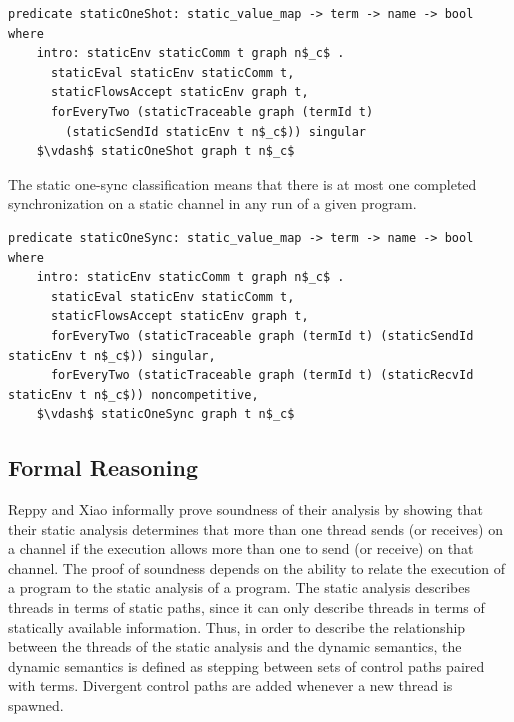 \documentclass[letterpaper, 11pt]{extarticle}
\begin{document}
\begin{lstlisting}[language=logic, mathescape]
  predicate staticOneShot: static_value_map -> term -> name -> bool where
    intro: staticEnv staticComm t graph n$_c$ .
      staticEval staticEnv staticComm t,
      staticFlowsAccept staticEnv graph t,
      forEveryTwo (staticTraceable graph (termId t)
        (staticSendId staticEnv t n$_c$)) singular
    $\vdash$ staticOneShot graph t n$_c$
\end{lstlisting}

The static one-sync classification means that there is at most one
completed synchronization on a static channel in any run of a given program.

\begin{lstlisting}[language=logic, mathescape]
  predicate staticOneSync: static_value_map -> term -> name -> bool where
    intro: staticEnv staticComm t graph n$_c$ .
      staticEval staticEnv staticComm t,
      staticFlowsAccept staticEnv graph t,
      forEveryTwo (staticTraceable graph (termId t) (staticSendId staticEnv t n$_c$)) singular,
      forEveryTwo (staticTraceable graph (termId t) (staticRecvId staticEnv t n$_c$)) noncompetitive,
    $\vdash$ staticOneSync graph t n$_c$
\end{lstlisting}



\subsection{Formal Reasoning}

Reppy and Xiao informally prove soundness of their analysis by showing that their static analysis
determines that more than one thread sends (or receives) on a channel if the execution allows more
than one to send (or receive) on that channel. The proof of soundness depends on the
ability to relate the execution of a program to the static analysis of a program. The static
analysis describes threads in terms of static paths, since it can only describe threads in
terms of statically available information. Thus, in order to describe the relationship between
the threads of the static analysis and the dynamic semantics, the dynamic semantics is
defined as stepping between sets of control paths paired with terms. Divergent control paths
are added whenever a new thread is spawned.
\end{document}
